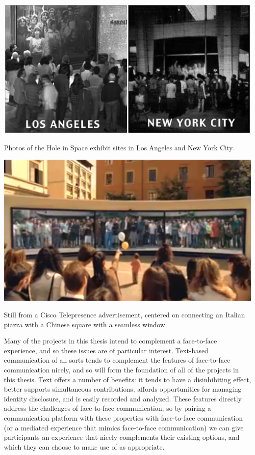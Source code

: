 \begin{marginfigure}
	\includegraphics{figures/hole_in_space.jpg}
	\caption{Photos of the Hole in Space exhibit sites in Los Angeles and New York City.}
	\label{fig:hole-in-space}
\end{marginfigure}

\begin{marginfigure}
	\includegraphics{figures/cisco-telepresence.png}
	\caption{Still from a Cisco Telepresence advertisement, centered on connecting an Italian piazza with a Chinese square with a seamless window.}
	\label{fig:cisco-telepresence}
\end{marginfigure}


Many of the projects in this thesis intend to complement a face-to-face experience, and so these issues are of particular interest. Text-based communication of all sorts tends to complement the features of face-to-face communication nicely, and so will form the foundation of all of the projects in this thesis. Text offers a number of benefits: it tends to have a disinhibiting effect, better supports simultaneous contributions, affords opportunities for managing identity disclosure, and is easily recorded and analyzed. These features directly address the challenges of face-to-face communication, so by pairing a communication platform with these properties with face-to-face communication (or a mediated experience that mimics face-to-face communication) we can give participants an experience that nicely complements their existing options, and which they can choose to make use of as appropriate.


